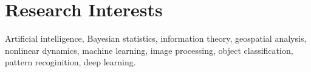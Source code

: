 \section{\sc Research Interests} %
Artificial intelligence, Bayesian statistics, information theory, geospatial analysis, nonlinear dynamics, machine learning, image processing, object classification, pattern recoginition, deep learning.

